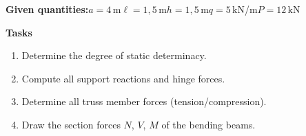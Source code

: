 \documentclass[a4paper,11pt]{article}
\begin{document}
\textbf{Given quantities:}\quad $a=4$\,m\quad $\ell=1,5$\,m\quad $h=1,5$\,m\quad $q=5$\,kN/m\quad $P=12$\,kN
\par\medskip
\textbf{Tasks}\par
\begin{enumerate}[label=\textbf{\arabic*.}]
  \item Determine the degree of static determinacy.
  \item Compute all support reactions and hinge forces.
  \item Determine all truss member forces (tension/compression).
  \item Draw the section forces $N$, $V$, $M$ of the bending beams.
\end{enumerate}
\end{document}

